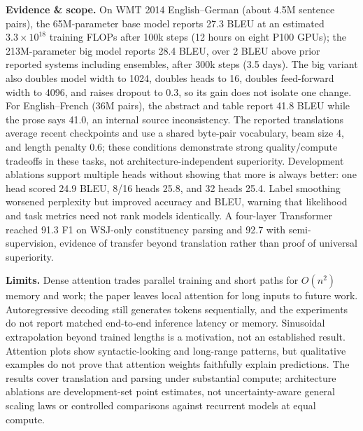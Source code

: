 \documentclass[10pt,letterpaper,twocolumn]{article}
\newcommand{\pehead}[1]{\textbf{#1.}\hspace{0.30em}}
\begin{document}
\pehead{Evidence \& scope} On WMT 2014 English--German (about 4.5M sentence pairs), the 65M-parameter base model reports 27.3 BLEU at an estimated $3.3\!\times\!10^{18}$ training FLOPs after 100k steps (12 hours on eight P100 GPUs); the 213M-parameter big model reports 28.4 BLEU, over 2 BLEU above prior reported systems including ensembles, after 300k steps (3.5 days). The big variant also doubles model width to 1024, doubles heads to 16, doubles feed-forward width to 4096, and raises dropout to $0.3$, so its gain does not isolate one change. For English--French (36M pairs), the abstract and table report 41.8 BLEU while the prose says 41.0, an internal source inconsistency. The reported translations average recent checkpoints and use a shared byte-pair vocabulary, beam size 4, and length penalty $0.6$; these conditions demonstrate strong quality/compute tradeoffs in these tasks, not architecture-independent superiority. Development ablations support multiple heads without showing that more is always better: one head scored 24.9 BLEU, 8/16 heads 25.8, and 32 heads 25.4. Label smoothing worsened perplexity but improved accuracy and BLEU, warning that likelihood and task metrics need not rank models identically. A four-layer Transformer reached 91.3 F1 on WSJ-only constituency parsing and 92.7 with semi-supervision, evidence of transfer beyond translation rather than proof of universal superiority.

\pehead{Limits} Dense attention trades parallel training and short paths for $O(n^2)$ memory and work; the paper leaves local attention for long inputs to future work. Autoregressive decoding still generates tokens sequentially, and the experiments do not report matched end-to-end inference latency or memory. Sinusoidal extrapolation beyond trained lengths is a motivation, not an established result. Attention plots show syntactic-looking and long-range patterns, but qualitative examples do not prove that attention weights faithfully explain predictions. The results cover translation and parsing under substantial compute; architecture ablations are development-set point estimates, not uncertainty-aware general scaling laws or controlled comparisons against recurrent models at equal compute.
\end{document}
